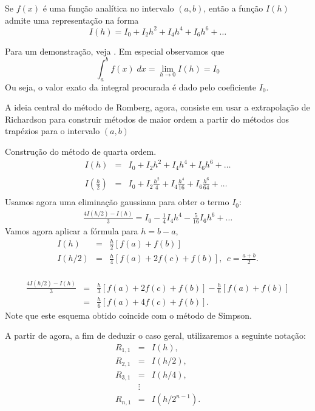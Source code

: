 \begin{teo} Se $f(x)$ é uma função analítica no intervalo $(a,b)$, então a função $I(h)$ admite uma representação na forma
\begin{equation} I(h)=I_0 + I_2 h^2 + I_4{h^4}+ I_6{h^6}+\ldots \end{equation}
\end{teo}
Para um demonstração, veja \cite{DEMAILLY}. Em especial observamos que
\begin{equation} \int_a^b f(x)\;dx = \lim_{h\to 0}I(h)=I_0 \end{equation}
Ou seja, o valor exato da integral procurada é dado pelo coeficiente $I_0$.

A ideia central do método de Romberg, agora, consiste em usar a extrapolação de Richardson para construir métodos de maior ordem a partir do métodos dos trapézios para o intervalo $(a,b)$
\begin{ex} \label{exemplo_romberg_1}Construção do método de quarta ordem.
\begin{eqnarray}
I(h)&=&I_0 + I_2 h^2 + I_4{h^4}+ I_6{h^6}+\ldots\\~\\
I\left(\frac{h}{2}\right)&=&I_0 + I_2 \frac{h^2}{4} + I_4\frac{h^4}{16}+ I_6\frac{h^6}{64}+\ldots\\
\end{eqnarray}
Usamos agora uma eliminação gaussiana para obter o termo $I_0$:
\begin{eqnarray}
\frac{4I(h/2)-I(h)}{3}=I_0-\frac{1}{4}I_4h^4-\frac{5}{16}I_6h^6+\ldots
\end{eqnarray}
Vamos agora aplicar a fórmula para $h=b-a$,
\begin{eqnarray}
I(h)&=& \frac{h}{2} \left[f(a)+f(b)\right]\\
I(h/2)&=& \frac{h}{4} \left[f(a)+2f\left(c\right)+f(b)\right],~~ c=\frac{a+b}{2}.\\
\end{eqnarray}

\begin{eqnarray}
\frac{4I(h/2)-I(h)}{3}&=&\frac{h}{3}\left[f(a)+2f\left(c\right)+f(b)\right]-\frac{h}{6} \left[f(a)+f(b)\right]\\
&=&\frac{h}{6}\left[f(a)+4f\left(c\right)+f(b)\right].
\end{eqnarray}
Note que este esquema obtido coincide com o método de Simpson.
\end{ex}

A partir de agora, a fim de deduzir o caso geral, utilizaremos a seguinte notação:
\begin{eqnarray}
R_{1,1}&=&I(h),\\
R_{2,1}&=&I(h/2),\\
R_{3,1}&=&I(h/4),\\
&\vdots&\\
R_{n,1}&=&I(h/2^{n-1}).
\end{eqnarray}

